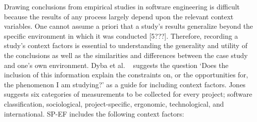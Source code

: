 Drawing conclusions from empirical studies in software engineering is difficult because the results of  any process largely depend upon the relevant context variables. One cannot assume a priori that a study’s results generalize beyond the specific environment in which it was conducted [5???]. Therefore, recording a study’s context factors is essential to understanding the generality and utility of the conclusions as well as the similarities and differences between the case study and one’s own environment. Dyba et al. ~\cite{dyba2012what} suggests the question `Does the inclusion of this information explain the constraints on, or the opportunities for, the phenomenon I am studying?' as a guide for including context factors. Jones~\cite{jones2000software} suggests six categories of measurements to be collected for every project; software classification, sociological, project-specific, ergonomic, technological, and international. SP-EF includes the following context factors:
